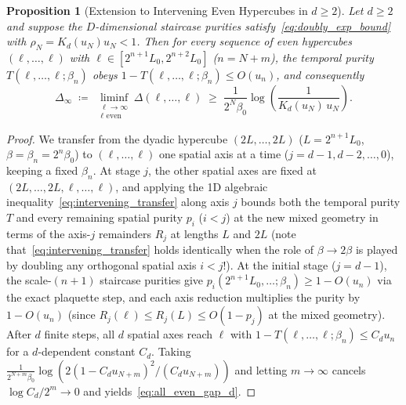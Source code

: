 \documentclass[11pt,a4paper]{article}
\newtheorem{proposition}[theorem]{Proposition}
\theoremstyle{definition}
\begin{document}
\begin{proposition}[Extension to Intervening Even Hypercubes in $d \ge 2$]
\label{prop:intervening_d}
Let $d \ge 2$ and suppose the $D$-dimensional staircase purities satisfy~\eqref{eq:doubly_exp_bound} with $\rho_N = K_d(u_N)u_N < 1$. Then for every sequence of even hypercubes $(\ell,\dots,\ell)$ with $\ell \in [2^{n+1} L_0, 2^{n+2} L_0]$ ($n = N+m$), the temporal purity $T(\ell,\dots,\ell; \beta_n)$ obeys $1 - T(\ell,\dots,\ell;\beta_n) \le O(u_n)$, and consequently
\begin{equation}
  \Delta_\infty \;\coloneqq\; \liminf_{\substack{\ell \to \infty \\ \ell \text{ even}}} \Delta(\ell,\dots,\ell)
  \;\ge\; \frac{1}{2^N \beta_0} \log\!\left(\frac{1}{K_d(u_N)\, u_N}\right).
  \label{eq:all_even_gap_d}
\end{equation}
\end{proposition}

\begin{proof}
We transfer from the dyadic hypercube $(2L,\dots,2L)$ ($L = 2^{n+1}L_0$, $\beta = \beta_n = 2^n \beta_0$) to $(\ell,\dots,\ell)$ one spatial axis at a time ($j = d-1, d-2, \dots, 0$), keeping a fixed $\beta_n$. At stage $j$, the other spatial axes are fixed at $(2L,\dots,2L,\ell,\dots,\ell)$, and applying the 1D algebraic inequality~\eqref{eq:intervening_transfer} along axis $j$ bounds both the temporal purity $T$ and every remaining spatial purity $p_i$ ($i < j$) at the new mixed geometry in terms of the axis-$j$ remainders $R_j$ at lengths $L$ and $2L$ (note that~\eqref{eq:intervening_transfer} holds identically when the role of $\beta \to 2\beta$ is played by doubling any orthogonal spatial axis $i < j$!). At the initial stage ($j = d-1$), the scale-$(n+1)$ staircase purities give $p_i(2^{n+1}L_0,\dots;\beta_n) \ge 1 - O(u_n)$ via the exact plaquette step, and each axis reduction multiplies the purity by $1 - O(u_n)$ (since $R_j(\ell) \le R_j(L) \le O(1 - p_j)$ at the mixed geometry). After $d$ finite steps, all $d$ spatial axes reach $\ell$ with $1 - T(\ell,\dots,\ell;\beta_n) \le C_d u_n$ for a $d$-dependent constant $C_d$. Taking $\frac{1}{2^{N+m}\beta_0}\log(2(1-C_d u_{N+m})^2 / (C_d u_{N+m}))$ and letting $m \to \infty$ cancels $\log C_d / 2^m \to 0$ and yields~\eqref{eq:all_even_gap_d}.
\end{proof}
\end{document}
